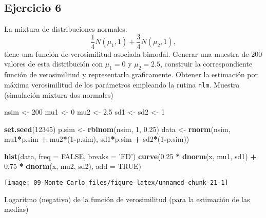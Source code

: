 \documentclass[
]{book}
\newenvironment{Shaded}{\begin{snugshade}}{\end{snugshade}}
\newcommand{\DataTypeTok}[1]{\textcolor[rgb]{0.13,0.29,0.53}{#1}}
\newcommand{\DecValTok}[1]{\textcolor[rgb]{0.00,0.00,0.81}{#1}}
\newcommand{\FloatTok}[1]{\textcolor[rgb]{0.00,0.00,0.81}{#1}}
\newcommand{\KeywordTok}[1]{\textcolor[rgb]{0.13,0.29,0.53}{\textbf{#1}}}
\newcommand{\NormalTok}[1]{#1}
\newcommand{\OperatorTok}[1]{\textcolor[rgb]{0.81,0.36,0.00}{\textbf{#1}}}
\newcommand{\OtherTok}[1]{\textcolor[rgb]{0.56,0.35,0.01}{#1}}
\newcommand{\StringTok}[1]{\textcolor[rgb]{0.31,0.60,0.02}{#1}}
\theoremstyle{break}
\theoremstyle{definition}
\theoremstyle{definition}
\theoremstyle{definition}
\theoremstyle{remark}
\begin{document}
\hypertarget{ejercicio-6}{%
\subsection{Ejercicio 6}\label{ejercicio-6}}

La mixtura de distribuciones normales:
\[\frac{1}{4}N(\mu_{1},1)+\frac{3}{4}N(\mu_{2},1),\]
tiene una función de verosimilitud asociada bimodal.
Generar una muestra de 200 valores de esta distribución con
\(\mu_{1}=0\) y \(\mu_{2}=2.5\), construir la correspondiente
función de verosimilitud y representarla graficamente. Obtener
la estimación por máxima verosimilitud de los parámetros
empleando la rutina \texttt{nlm}.
Muestra (simulación mixtura dos normales)

\begin{Shaded}
\begin{Highlighting}[]
\NormalTok{nsim <-}\StringTok{ }\DecValTok{200}
\NormalTok{mu1 <-}\StringTok{ }\DecValTok{0} 
\NormalTok{mu2 <-}\StringTok{ }\FloatTok{2.5}
\NormalTok{sd1 <-}\StringTok{ }\NormalTok{sd2 <-}\StringTok{ }\DecValTok{1}

\KeywordTok{set.seed}\NormalTok{(}\DecValTok{12345}\NormalTok{)}
\NormalTok{p.sim <-}\StringTok{ }\KeywordTok{rbinom}\NormalTok{(nsim, }\DecValTok{1}\NormalTok{, }\FloatTok{0.25}\NormalTok{)}
\NormalTok{data <-}\StringTok{ }\KeywordTok{rnorm}\NormalTok{(nsim, mu1}\OperatorTok{*}\NormalTok{p.sim }\OperatorTok{+}\StringTok{ }\NormalTok{mu2}\OperatorTok{*}\NormalTok{(}\DecValTok{1}\OperatorTok{-}\NormalTok{p.sim), sd1}\OperatorTok{*}\NormalTok{p.sim }\OperatorTok{+}\StringTok{ }\NormalTok{sd2}\OperatorTok{*}\NormalTok{(}\DecValTok{1}\OperatorTok{-}\NormalTok{p.sim))}

\KeywordTok{hist}\NormalTok{(data, }\DataTypeTok{freq =} \OtherTok{FALSE}\NormalTok{, }\DataTypeTok{breaks =} \StringTok{'FD'}\NormalTok{)}
\KeywordTok{curve}\NormalTok{(}\FloatTok{0.25} \OperatorTok{*}\StringTok{ }\KeywordTok{dnorm}\NormalTok{(x, mu1, sd1) }\OperatorTok{+}\StringTok{ }\FloatTok{0.75} \OperatorTok{*}\StringTok{ }\KeywordTok{dnorm}\NormalTok{(x, mu2, sd2), }\DataTypeTok{add =} \OtherTok{TRUE}\NormalTok{)}
\end{Highlighting}
\end{Shaded}

\begin{center}\texttt{[image: 09-Monte\_Carlo\_files/figure-latex/unnamed-chunk-21-1]} \end{center}

Logaritmo (negativo) de la función de verosimilitud
(para la estimación de las medias)
\end{document}
